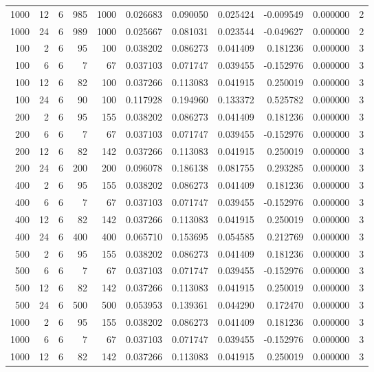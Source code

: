 \begin{table}
\begin{tabular}{rrrrrrrrrrr}
1000 & 12 & 6 & 985 & 1000 & 0.026683 & 0.090050 & 0.025424 & -0.009549 & 0.000000 & 2 \\
1000 & 24 & 6 & 989 & 1000 & 0.025667 & 0.081031 & 0.023544 & -0.049627 & 0.000000 & 2 \\
100 & 2 & 6 & 95 & 100 & 0.038202 & 0.086273 & 0.041409 & 0.181236 & 0.000000 & 3 \\
100 & 6 & 6 & 7 & 67 & 0.037103 & 0.071747 & 0.039455 & -0.152976 & 0.000000 & 3 \\
100 & 12 & 6 & 82 & 100 & 0.037266 & 0.113083 & 0.041915 & 0.250019 & 0.000000 & 3 \\
100 & 24 & 6 & 90 & 100 & 0.117928 & 0.194960 & 0.133372 & 0.525782 & 0.000000 & 3 \\
200 & 2 & 6 & 95 & 155 & 0.038202 & 0.086273 & 0.041409 & 0.181236 & 0.000000 & 3 \\
200 & 6 & 6 & 7 & 67 & 0.037103 & 0.071747 & 0.039455 & -0.152976 & 0.000000 & 3 \\
200 & 12 & 6 & 82 & 142 & 0.037266 & 0.113083 & 0.041915 & 0.250019 & 0.000000 & 3 \\
200 & 24 & 6 & 200 & 200 & 0.096078 & 0.186138 & 0.081755 & 0.293285 & 0.000000 & 3 \\
400 & 2 & 6 & 95 & 155 & 0.038202 & 0.086273 & 0.041409 & 0.181236 & 0.000000 & 3 \\
400 & 6 & 6 & 7 & 67 & 0.037103 & 0.071747 & 0.039455 & -0.152976 & 0.000000 & 3 \\
400 & 12 & 6 & 82 & 142 & 0.037266 & 0.113083 & 0.041915 & 0.250019 & 0.000000 & 3 \\
400 & 24 & 6 & 400 & 400 & 0.065710 & 0.153695 & 0.054585 & 0.212769 & 0.000000 & 3 \\
500 & 2 & 6 & 95 & 155 & 0.038202 & 0.086273 & 0.041409 & 0.181236 & 0.000000 & 3 \\
500 & 6 & 6 & 7 & 67 & 0.037103 & 0.071747 & 0.039455 & -0.152976 & 0.000000 & 3 \\
500 & 12 & 6 & 82 & 142 & 0.037266 & 0.113083 & 0.041915 & 0.250019 & 0.000000 & 3 \\
500 & 24 & 6 & 500 & 500 & 0.053953 & 0.139361 & 0.044290 & 0.172470 & 0.000000 & 3 \\
1000 & 2 & 6 & 95 & 155 & 0.038202 & 0.086273 & 0.041409 & 0.181236 & 0.000000 & 3 \\
1000 & 6 & 6 & 7 & 67 & 0.037103 & 0.071747 & 0.039455 & -0.152976 & 0.000000 & 3 \\
1000 & 12 & 6 & 82 & 142 & 0.037266 & 0.113083 & 0.041915 & 0.250019 & 0.000000 & 3 \\

\end{tabular}
\end{table}

